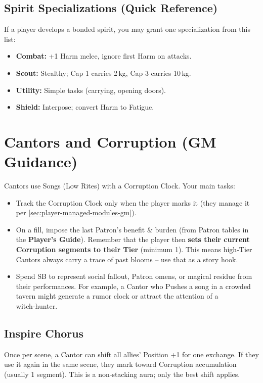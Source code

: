 \subsection*{Spirit Specializations (Quick Reference)}
If a player develops a bonded spirit, you may grant one specialization from this list:
\begin{itemize}
  \item \textbf{Combat:} +1 Harm melee, ignore first Harm on attacks.
  \item \textbf{Scout:} Stealthy; Cap 1 carries 2 kg, Cap 3 carries 10 kg.
  \item \textbf{Utility:} Simple tasks (carrying, opening doors).
  \item \textbf{Shield:} Interpose; convert Harm to Fatigue.
\end{itemize}

\section{Cantors and Corruption (GM Guidance)}
\label{sec:cantors-gm}

Cantors use Songs (Low Rites) with a Corruption Clock. Your main tasks:
\begin{itemize}
  \item Track the Corruption Clock only when the player marks it (they manage it per \ref{sec:player-managed-modules-gm}).
  \item On a fill, impose the last Patron’s benefit \& burden (from Patron tables in the \textbf{Player's Guide}). Remember that the player then \textbf{sets their current Corruption segments to their Tier} (minimum 1). This means high‑Tier Cantors always carry a trace of past blooms – use that as a story hook.
  \item Spend SB to represent social fallout, Patron omens, or magical residue from their performances. For example, a Cantor who Pushes a song in a crowded tavern might generate a rumor clock or attract the attention of a witch‑hunter.
\end{itemize}

\subsection*{Inspire Chorus}
\label{subsec:inspire-chorus}
Once per scene, a Cantor can shift all allies’ Position +1 for one exchange. If they use it again in the same scene, they mark toward Corruption accumulation (usually 1 segment). This is a non‑stacking aura; only the best shift applies.

